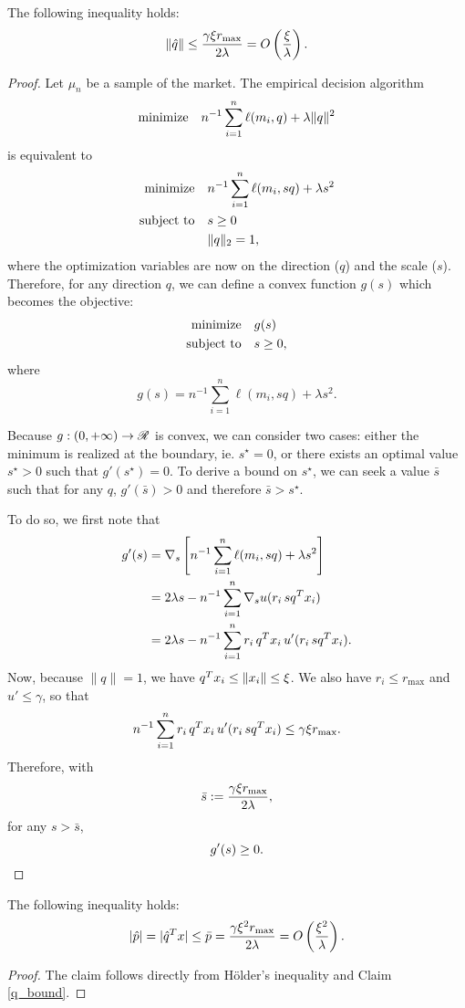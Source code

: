 \begin{claim}
  \label{q_bound}
  The following inequality holds:
  \[
    \|\hat q\| \leq \frac{\gamma\xi r_{\max}}{2\lambda} = O\left(\frac{\xi}{\lambda}\right).
  \]
\end{claim}
\begin{proof}
  Let $\mu_n$ be a sample of the market. The empirical decision algorithm 
  \[
    \text{minimize} \quad {n^{-1}\sum_{i=1}^n\ell(m_i,q) + \lambda\|q\|^2}
  \]
  is equivalent to 
  \begin{align*}
    \minimizeEquationSt{n^{-1}\sum_{i=1}^n \ell(m_i,sq) + \lambda s^2}[s\geq0\\,\|q\|_2=1],
  \end{align*}
  where the optimization variables are now on the direction ($q$) and the scale
  ($s$). Therefore, for any direction $q$, we can define a convex function $g(s)$ which
  becomes the objective:
  \begin{align*}
    \minimizeEquationSt{g(s)}[s\geq 0],
  \end{align*}
  where
  \[
    g(s) = n^{-1}\sum_{i=1}^n \ell(m_i, sq) + \lambda s^2.
  \]
  
  Because $g:(0,+\infty)\to\mathscr{R}$ is convex, we can consider two cases: either the minimum
  is realized at the boundary, ie. $s^\star=0$, or there exists an optimal value
  $s^\star > 0$ such that $g'(s^\star)=0$. To derive a bound on $s^\star$, we can seek a
  value $\bar s$ such that for any $q$, $g'(\bar s)>0$ and therefore $\bar s > s^\star$.

  To do so, we first note that 
  \begin{align*}
    g'(s) &= \nabla_s \left[n^{-1}\sum_{i=1}^n\ell(m_i,sq) + \lambda s^2\right]\\
          &= 2\lambda s - n^{-1}\sum_{i=1}^n \nabla_s u(r_i\,sq^Tx_i)\\
          &= 2\lambda s - n^{-1}\sum_{i=1}^n r_i\,q^Tx_i \, u'(r_i\,sq^Tx_i).
  \end{align*}
  Now, because $\|q\|=1$, we have $q^Tx_i\leq\|x_i\|\leq\xi$. We also have
  $r_i\leq r_{\max}$ and $u'\leq\gamma$, so that
  \[
    n^{-1}\sum_{i=1}^n r_i\,q^Tx_i \, u'(r_i\,sq^Tx_i) \leq \gamma\xi r_{\max}.
  \]
  Therefore, with
  \[
    \bar s := \frac{\gamma\xi r_{\max}}{2\lambda},
  \]
  for any $s>\bar s$,
  \[
    g'(s) \geq 0.\qedhere
  \]
\end{proof}

\begin{claim}
  \label{p_bound}
  The following inequality holds:
  \[
    |\hat p| = |\hat q^Tx| \leq \bar p =\frac{\gamma\xi^2 r_{\max}}{2\lambda} =
    O\left(\frac{\xi^2}{\lambda}\right).
  \]
\end{claim}
\begin{proof}
  The claim follows directly from Hölder's inequality and Claim \ref{q_bound}.
\end{proof}

